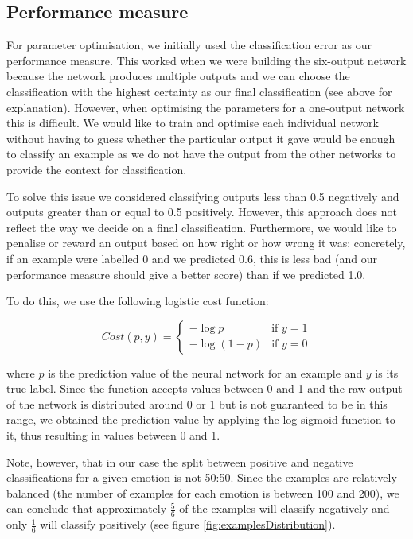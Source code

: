 \documentclass[10pt,a4paper]{article}
\begin{document}
\subsection{Performance measure}
For parameter optimisation, we initially used the classification error as our performance measure. This worked when we were building the six-output network because the network produces multiple outputs and we can choose the classification with the highest certainty as our final classification (see above for explanation). However, when optimising the parameters for a one-output network this is difficult. We would like to train and optimise each individual network without having to guess whether the particular output it gave would be enough to classify an example as we do not have the output from the other networks to provide the context for classification. 

To solve this issue we considered classifying outputs less than 0.5 negatively and outputs greater than or equal to 0.5 positively. However, this approach does not reflect the way we decide on a final classification. Furthermore, we would like to penalise or reward an output based on how right or how wrong it was: concretely, if an example were labelled 0 and we predicted 0.6, this is less bad (and our performance measure should give a better score) than if we predicted 1.0. 

To do this, we use the following logistic cost function:

\[
    Cost(p, y)= 
\begin{cases}
    -\log{p}& \text{if } y = 1\\
    -\log{(1 - p)}              & \text{if } y = 0
\end{cases}
\]

where $p$ is the prediction value of the neural network for an example and $y$ is its true label. Since the function accepts values between 0 and 1 and the raw output of the network is distributed around 0 or 1 but is not guaranteed to be in this range, we obtained the prediction value by applying the log sigmoid function to it, thus resulting in values between 0 and 1. 

Note, however, that in our case the split between positive and negative classifications for a given emotion is not 50:50. Since the examples are relatively balanced (the number of examples for each emotion is between 100 and 200), we can conclude that approximately $\frac{5}{6}$ of the examples will classify negatively and only $\frac{1}{6}$ will classify positively (see figure \ref{fig:examplesDistribution}).
\end{document}
